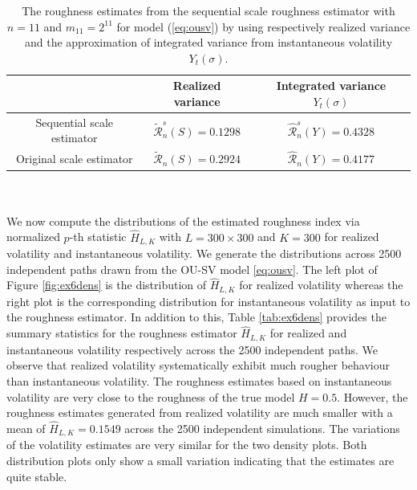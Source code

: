 \documentclass{article}
\begin{document}
\begin{table}[htbp]
    \centering
    \begin{tabular}{ccc}
        \toprule
         & Realized variance & Integrated variance $Y_t(\sigma)$ \\
        \midrule
        Sequential scale estimator & $\widetilde{\mathscr{R}}_n^s (S) = 0.1298 $ & $\widehat{\mathscr{R}}_n^s (Y) = 0.4328$ \\
        Original scale estimator &$\widetilde{\mathscr{R}}_n (S) = 0.2924 $ & $\widehat{\mathscr{R}}_n (Y) = 0.4177$ \\
        \bottomrule
    \end{tabular}
    \caption{The roughness estimates from the sequential scale roughness estimator with $n=11$ and $m_{11}=2^{11}$ for model (\ref{eq:ousv}) by using respectively realized variance and the approximation of integrated variance from instantaneous volatility $Y_t(\sigma)$.}
    \label{tab:ex6scaleest}
\end{table}\\\\
We now compute the distributions of the estimated roughness index via normalized $p$-th statistic $\widehat{H}_{L,K}$ with $L=300\times 300$ and $K=300$ for realized volatility and instantaneous volatility. We generate the distributions across 2500 independent paths drawn from the OU-SV model \eqref{eq:ousv}. The left plot of Figure \ref{fig:ex6dens} is the distribution of $\widehat{H}_{L,K}$ for realized volatility whereas the right plot is the corresponding distribution for instantaneous volatility as input to the roughness estimator. In addition to this, Table \ref{tab:ex6dens} provides the summary statistics for the roughness estimator $\widehat{H}_{L,K}$ for realized and instantaneous volatility respectively across the 2500 independent paths. We observe that realized volatility systematically exhibit much rougher behaviour than instantaneous volatility. The roughness estimates based on instantaneous volatility are very close to the roughness of the true model $H=0.5$. However, the roughness estimates generated from realized volatility are much smaller with a mean of $\widehat{H}_{L,K}=0.1549$ across the 2500 independent simulations. The variations of the volatility estimates are very similar for the two density plots. Both distribution plots only show a small variation indicating that the estimates are quite stable.
\end{document}
